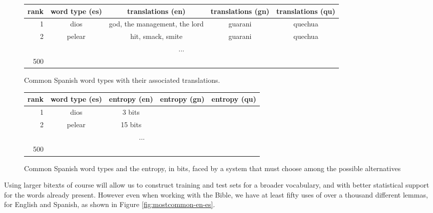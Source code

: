 \begin{figure*}
  \begin{centering}
  \begin{tabular}{|r|c|c|c|c|}
    \hline
    rank & word type (es) & translations (en) & translations (gn) & translations (qu) \\
    \hline
    1    & dios   &  god, the management, the lord & guarani & quechua \\
    2    & pelear &  hit, smack, smite             & guarani & quechua \\
    \multicolumn{5}{|c|}{...} \\ 
    500 &  & & & \\
    \hline
  \end{tabular}
  \end{centering}
  \caption{Common Spanish word types with their associated translations.}
  \label{fig:mostcommon-es-translations}
\end{figure*}

\begin{figure*}
  \begin{centering}
  \begin{tabular}{|r|c|c|c|c|}
    \hline
    rank & word type (es) & entropy (en) & entropy (gn) & entropy (qu) \\
    \hline
    1    & dios   & 3 bits  &  &  \\
    2    & pelear & 15 bits &  &  \\
    \multicolumn{5}{|c|}{...} \\ 
    500 &  & & & \\
    \hline
  \end{tabular}
  \end{centering}
  \caption{Common Spanish word types and the entropy, in bits, faced by a
  system that must choose among the possible alternatives} 
  \label{fig:mostcommon-es-entropy}
\end{figure*}

Using larger bitexts of course will allow us to construct training and test
sets for a broader vocabulary, and with better statistical support for the
words already present. However even when working with the Bible, we
have at least fifty uses of over a thousand different lemmas, for English and
Spanish, as shown in Figure \ref{fig:mostcommon-en-es}.


